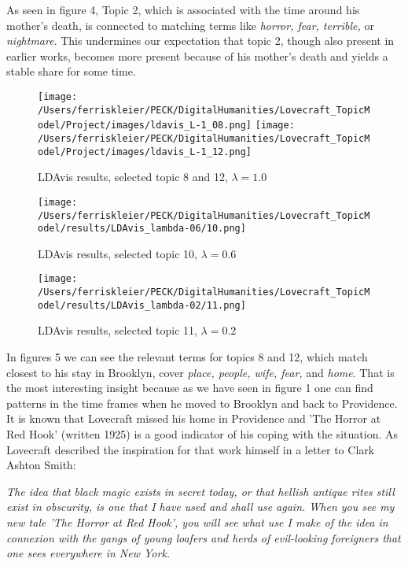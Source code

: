 As seen in figure 4, Topic 2, which is associated with the time around his mother’s death, is 
connected to matching terms like \textit{horror, fear, terrible,} or \textit{nightmare}. This undermines our expectation 
that topic 2, though also present in earlier works, becomes more present because of his mother's death 
and yields a stable share for some time.\\

\begin{figure}[p]
    \centering
    \texttt{[image: /Users/ferriskleier/PECK/DigitalHumanities/Lovecraft\_TopicModel/Project/images/ldavis\_L-1\_08.png]}
    \texttt{[image: /Users/ferriskleier/PECK/DigitalHumanities/Lovecraft\_TopicModel/Project/images/ldavis\_L-1\_12.png]}
    \caption{LDAvis results, selected topic 8 and 12, $\lambda=1.0$}
    \label{fig:mesh5}
\end{figure}

\begin{figure}[p]
    \centering
    \texttt{[image: /Users/ferriskleier/PECK/DigitalHumanities/Lovecraft\_TopicModel/results/LDAvis\_lambda-06/10.png]}
    \caption{LDAvis results, selected topic 10, $\lambda=0.6$}
    \label{fig:mesh6}
\end{figure}

\begin{figure}[ht]
    \centering
    \texttt{[image: /Users/ferriskleier/PECK/DigitalHumanities/Lovecraft\_TopicModel/results/LDAvis\_lambda-02/11.png]}
    \caption{LDAvis results, selected topic 11, $\lambda=0.2$}
    \label{fig:mesh7}
\end{figure}

In figures 5 we can see the relevant terms for topics 8 and 12, which match closest to his stay 
in Brooklyn, cover \textit{place, people, wife, fear,} and \textit{home}. That is the most interesting insight because 
as we have seen in figure 1 one can find patterns in the time frames when he moved to Brooklyn and 
back to Providence. It is known that Lovecraft missed his home in Providence and 'The Horror at 
Red Hook' (written 1925) is a good indicator of his coping with the situation. As Lovecraft 
described the inspiration for that work himself in a letter to Clark Ashton Smith:

\begin{displayquote}
    \textit{The idea that black magic exists in secret today, or that hellish antique rites still 
    exist in obscurity, is one that I have used and shall use again. When you see my new tale 
    'The Horror at Red Hook', you will see what use I make of the idea in connexion with the 
    gangs of young loafers and herds of evil-looking foreigners that one sees everywhere in 
    New York.} \cite{letter}
\end{displayquote}

